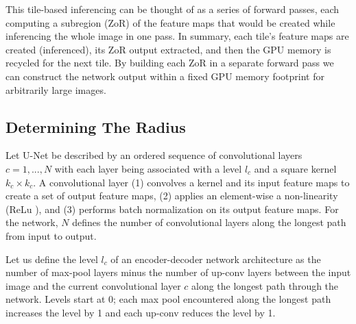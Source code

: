 \documentclass[runningheads]{llncs}
\begin{document}
This tile-based inferencing can be thought of as a series of forward passes, each computing a subregion (ZoR) of the feature maps that would be created while inferencing the whole image in one pass. 
In summary, each tile's feature maps are created (inferenced), its ZoR output extracted, and then the GPU memory is recycled for the next tile. By building each ZoR in a separate forward pass we can construct the network output within a fixed GPU memory footprint for arbitrarily large images. 


\subsection{Determining The Radius}


Let U-Net be described by an ordered sequence of convolutional layers $c={1, ..., N}$ with each layer being associated with a level $l_{c}$ and a square kernel $k_{c} \times k_{c}$. 
A convolutional layer (1) convolves a kernel and its input feature maps to create a set of output feature maps, (2) applies an element-wise a non-linearity (ReLu \cite{lecun2015deep}), and (3) performs batch normalization \cite{ioffe2015batch} on its output feature maps.
For the network, $N$ defines the number of convolutional layers along the longest path from input to output. 

Let us define the level $l_{c}$ of an encoder-decoder network architecture as the number of max-pool layers minus the number of up-conv layers between the input image and the current convolutional layer $c$ along the longest path through the network. Levels start at 0; each max pool encountered along the longest path increases the level by 1 and each up-conv reduces the level by 1. 
\end{document}
